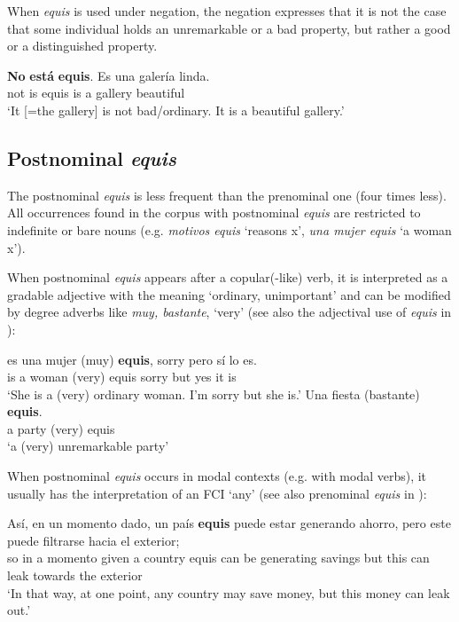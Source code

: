 \documentclass[output=paper]{langsci/langscibook}
\begin{document}
When \textit{equis} is used under negation, the negation expresses that it is not the case that some individual holds an unremarkable or a bad property, but rather a good or a distinguished property.

\ea\label{ex:kellert:21}
\gll \textbf{No} \textbf{está} \textbf{equis}. Es una galería linda.\\
not is equis is a gallery beautiful\\
\glt ‘It [=the gallery] is not bad/ordinary. It is a beautiful gallery.’
\z

\subsection{Postnominal \textit{equis}}\label{sec:kellert:2.3}
The postnominal \textit{equis} is less frequent than the prenominal one (four times less). All occurrences found in the corpus with postnominal \textit{equis} are restricted to indefinite or bare nouns (e.g.  \textit{motivos equis} ‘reasons x’, \textit{una mujer equis} ‘a woman x’).\largerpage

When postnominal \textit{equis} appears after a copular(-like) verb, it is interpreted as a gradable adjective with the meaning ‘ordinary, unimportant’ and can be modified by degree adverbs like \textit{muy, bastante}, ‘very’ (see also the adjectival use of \textit{equis} in ):

\ea\label{ex:kellert:22}
\gll  es una mujer (muy) \textbf{equis}, sorry pero sí lo es.\\
is a woman (very) equis sorry but yes it is\\
\glt ‘She is a (very) ordinary woman. I’m sorry but she is.’
\ex 
\gll  Una fiesta (bastante) \textbf{equis}.\\
a party (very) equis\\
\glt ‘a (very) unremarkable party’
\z

When postnominal \textit{equis} occurs in modal contexts (e.g. with modal verbs), it usually has the interpretation of an FCI ‘any’ (see also prenominal \textit{equis} in ):

\ea\label{ex:kellert:24}
\gll  Así, en un momento dado, un país \textbf{equis} puede estar generando ahorro, pero este puede filtrarse hacia el exterior;\\
so in a momento given a country equis can be generating savings but this can leak towards the exterior\\
\glt ‘In that way, at one point, any country may save money, but this money can leak out.’
\z
\end{document}
